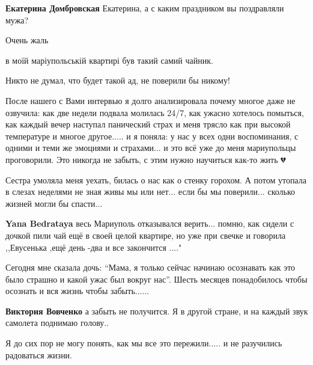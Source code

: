 \begin{itemize} %
\textbf{Екатерина Домбровская} Екатерина, а с каким праздником вы поздравляли мужа?
\end{itemize} %


Очень жаль 🥲


в моїй маріупольській квартирі був такий самий чайник.


Никто не думал, что будет такой ад, не поверили бы никому!


После нашего с Вами интервью я долго анализировала почему многое даже не
озвучила: как две недели подвала молилась 24/7, как ужасно хотелось
помыться, как каждый вечер наступал панический страх и меня трясло как при
высокой температуре и многое другое..... и я поняла: у нас у всех одни
воспоминания, с одними и теми же эмоциями и страхами... и это всё уже до меня
мариупольцы проговорили. Это никогда не забыть, с этим нужно научиться как-то
жить 💔


Сестра умоляла меня уехать, билась о нас как о стенку горохом. А потом утопала
в слезах неделями не зная живы мы или нет... если бы мы поверили... сколько жизней
могли бы спасти...

\begin{itemize} %
\textbf{Yana Bedrataya} весь Мариуполь отказывался верить... помню, как сидели с дочкой пили чай ещё в своей целой квартире, но уже при свечке и говорила ,,Евусенька ,ещё день -два и все закончится ...."
\end{itemize} %


Сегодня мне сказала дочь: \enquote{Мама, я только сейчас начинаю осознавать как это было
страшно и какой ужас был вокруг нас}. Шесть месяцев понадобилось чтобы осознать
и вся жизнь чтобы забыть......

\begin{itemize} %
\textbf{Виктория Вовченко} а забыть не получится. Я в другой стране, и на каждый звук самолета поднимаю голову..
\end{itemize} %


Я до сих пор не могу понять, как мы все это пережили..... и не разучились радоваться жизни.

